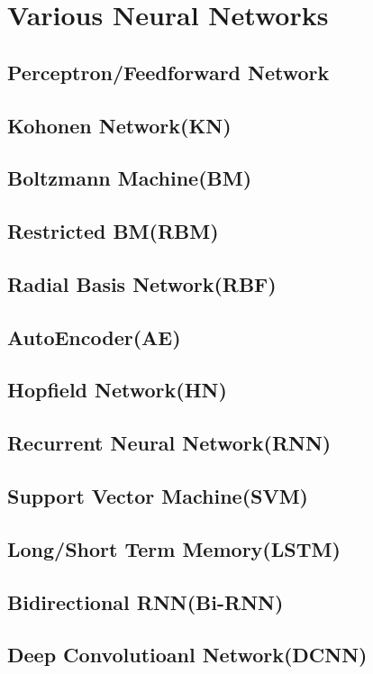 \section{Various Neural Networks} 
\subsection{Perceptron/Feedforward Network \cite{perceptron} }
\subsection{Kohonen Network(KN) \cite{KN}}
\subsection{Boltzmann Machine(BM) \cite{BM}}
\subsection{Restricted BM(RBM) \cite{RBM}}
\subsection{Radial Basis Network(RBF) \cite{RBF}}
\subsection{AutoEncoder(AE) \cite{AE}}
\subsection{Hopfield Network(HN) \cite{HN}}
\subsection{Recurrent Neural Network(RNN) \cite{RNN}}
\subsection{Support Vector Machine(SVM) \cite{SVM}}
\subsection{Long/Short Term Memory(LSTM) \cite{LSTM}}
\subsection{Bidirectional RNN(Bi-RNN) \cite{Bi-RNN}}
\subsection{Deep Convolutioanl Network(DCNN) \cite{DCNN}}
